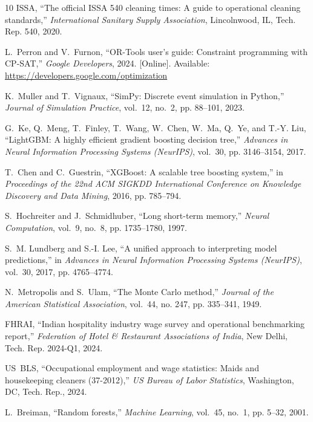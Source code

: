\documentclass[11pt,a4paper]{article}
\begin{document}
\begin{thebibliography}{10}
ISSA, ``The official ISSA 540 cleaning times: A guide to operational cleaning standards,'' \emph{International Sanitary Supply Association}, Lincolnwood, IL, Tech. Rep. 540, 2020.

L.~Perron and V.~Furnon, ``OR-Tools user's guide: Constraint programming with CP-SAT,'' \emph{Google Developers}, 2024. [Online]. Available: \url{https://developers.google.com/optimization}

K.~Muller and T.~Vignaux, ``SimPy: Discrete event simulation in Python,'' \emph{Journal of Simulation Practice}, vol.~12, no.~2, pp. 88--101, 2023.

G.~Ke, Q.~Meng, T.~Finley, T.~Wang, W.~Chen, W.~Ma, Q.~Ye, and T.-Y. Liu, ``LightGBM: A highly efficient gradient boosting decision tree,'' \emph{Advances in Neural Information Processing Systems (NeurIPS)}, vol.~30, pp. 3146--3154, 2017.

T.~Chen and C.~Guestrin, ``XGBoost: A scalable tree boosting system,'' in \emph{Proceedings of the 22nd ACM SIGKDD International Conference on Knowledge Discovery and Data Mining}, 2016, pp. 785--794.

S.~Hochreiter and J.~Schmidhuber, ``Long short-term memory,'' \emph{Neural Computation}, vol.~9, no.~8, pp. 1735--1780, 1997.

S.~M. Lundberg and S.-I. Lee, ``A unified approach to interpreting model predictions,'' in \emph{Advances in Neural Information Processing Systems (NeurIPS)}, vol.~30, 2017, pp. 4765--4774.

N.~Metropolis and S.~Ulam, ``The Monte Carlo method,'' \emph{Journal of the American Statistical Association}, vol.~44, no. 247, pp. 335--341, 1949.

FHRAI, ``Indian hospitality industry wage survey and operational benchmarking report,'' \emph{Federation of Hotel \& Restaurant Associations of India}, New Delhi, Tech. Rep. 2024-Q1, 2024.

US~BLS, ``Occupational employment and wage statistics: Maids and housekeeping cleaners (37-2012),'' \emph{US Bureau of Labor Statistics}, Washington, DC, Tech. Rep., 2024.

L.~Breiman, ``Random forests,'' \emph{Machine Learning}, vol.~45, no.~1, pp. 5--32, 2001.

\end{thebibliography}
\end{document}
